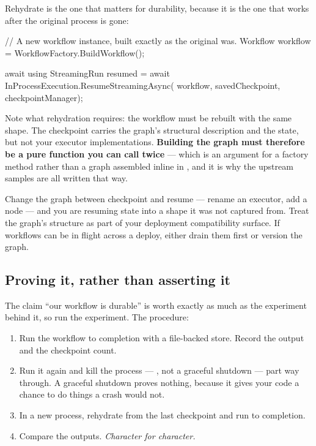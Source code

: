 Rehydrate is the one that matters for durability, because it is the one that
works after the original process is gone:

\begin{csharp}[caption={Continuing in a new process}, label={lst:dur-rehydrate}]
// A new workflow instance, built exactly as the original was.
Workflow workflow = WorkflowFactory.BuildWorkflow();

await using StreamingRun resumed = await InProcessExecution.ResumeStreamingAsync(
    workflow, savedCheckpoint, checkpointManager);
\end{csharp}

Note what rehydration requires: the workflow must be rebuilt with the same
shape. The checkpoint carries the graph's structural description and the state,
but not your executor implementations. \textbf{Building the graph must therefore
be a pure function you can call twice} --- which is an argument for a
 factory method rather than a graph assembled inline in
, and it is why the upstream samples are all written that way.

\begin{warning}
Change the graph between checkpoint and resume --- rename an executor, add a node
--- and you are resuming state into a shape it was not captured from. Treat the
graph's structure as part of your deployment compatibility surface. If workflows
can be in flight across a deploy, either drain them first or version the graph.
\end{warning}

\subsection{Proving it, rather than asserting it}
\label{sec:dur-proving}

The claim ``our workflow is durable'' is worth exactly as much as the experiment
behind it, so run the experiment. The procedure:

\begin{enumerate}[leftmargin=1.4em]
\item Run the workflow to completion with a file-backed store. Record the output
      and the checkpoint count.
\item Run it again and kill the process --- , not a graceful
      shutdown --- part way through. A graceful shutdown proves nothing, because
      it gives your code a chance to do things a crash would not.
\item In a new process, rehydrate from the last checkpoint and run to completion.
\item Compare the outputs. \emph{Character for character.}
\end{enumerate}

